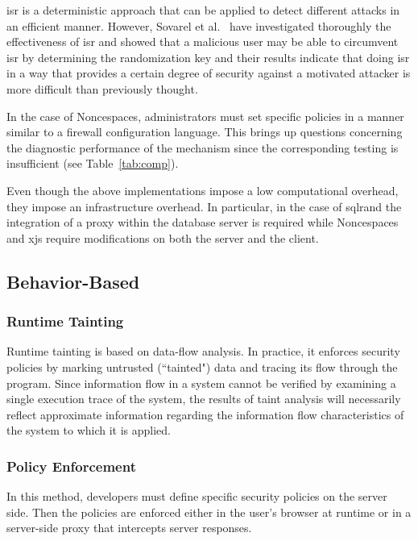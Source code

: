 \documentclass[conference]{IEEEtran}
\begin{document}
{\sc isr} is a deterministic approach that can be applied
to detect different attacks in an efficient manner.
However, Sovarel et al.~\cite{SEP05}
have investigated thoroughly the effectiveness
of {\sc isr} and showed that a malicious user
may be able to circumvent {\sc isr} by determining
the randomization key and their results
indicate that doing {\sc isr} in a way that
provides a certain degree of security against a motivated
attacker is more difficult than previously thought.

In the case of Noncespaces, administrators must set
specific policies in a manner similar to a firewall
configuration language. This brings up questions
concerning the diagnostic performance of the mechanism
since the corresponding testing is insufficient
(see Table~\ref{tab:comp}).

Even though the above implementations impose a low
computational overhead, they impose an infrastructure
overhead. In particular, in the case of {\sc sql}rand
the integration of a proxy within the database server
is required while Noncespaces and x{\sc js} require
modifications on both the server and the client.

\subsection{Behavior-Based}

\subsubsection{Runtime Tainting}

Runtime tainting is based on data-flow analysis.
In practice, it enforces security policies by marking untrusted
(``tainted") data and tracing its flow through the program.
Since information flow in a system cannot be verified by examining
a single execution trace of the system, the results of taint
analysis will necessarily reflect approximate information regarding
the information flow characteristics of the system to which it is applied.

\subsubsection{Policy Enforcement}

In this method, developers must define
specific security policies on the server side.
Then the policies are enforced either in the user's
browser at runtime or in a server-side proxy that
intercepts server responses.
\end{document}
